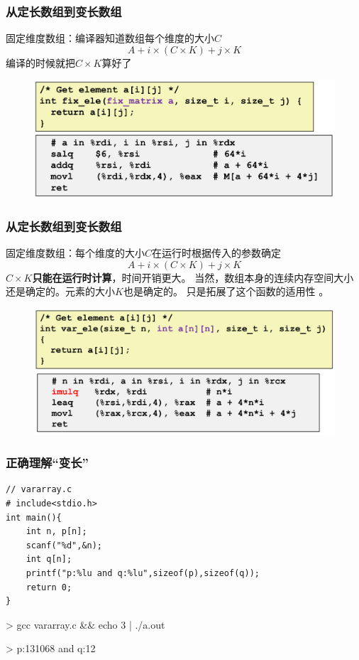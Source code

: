 \documentclass[12pt,AutoFakeBold,aspectratio=169,mathserif]{beamer}
\begin{document}
    \begin{frame}
        \frametitle{从定长数组到变长数组}
    
        固定维度数组：编译器知道数组每个维度的大小\(C\)
        \[A+i\times (C\times K)+j\times K\]
        编译的时候就把\(C\times K\)算好了
        \begin{figure}
            \includegraphics[width=.8\textwidth]{figures/fixed.png}
        \end{figure}
    
    \end{frame}

    \begin{frame}
        \frametitle{从定长数组到变长数组}
    
        固定维度数组：每个维度的大小\(C\)在运行时根据传入的参数确定
        \[A+i\times (C\times K)+j\times K\]
        \textbf{\(C\times K\)只能在运行时计算}，时间开销更大。
% 
        当然，数组本身的连续内存空间大小还是确定的。元素的大小\(K\)也是确定的。
% 
        只是拓展了这个函数的适用性
        。
        \begin{figure}
            \includegraphics[width=.8\textwidth]{figures/var.png}
        \end{figure}
    
    \end{frame}

    \begin{frame}[fragile]
        \frametitle{正确理解“变长”}
    
        \begin{lstlisting}
// vararray.c
# include<stdio.h>
int main(){
    int n, p[n];
    scanf("%d",&n);
    int q[n];
    printf("p:%lu and q:%lu",sizeof(p),sizeof(q));
    return 0;
}
        \end{lstlisting}

        > gcc vararray.c \&\& echo 3 | ./a.out

        > p:131068 and q:12
    
    \end{frame}
\end{document}
